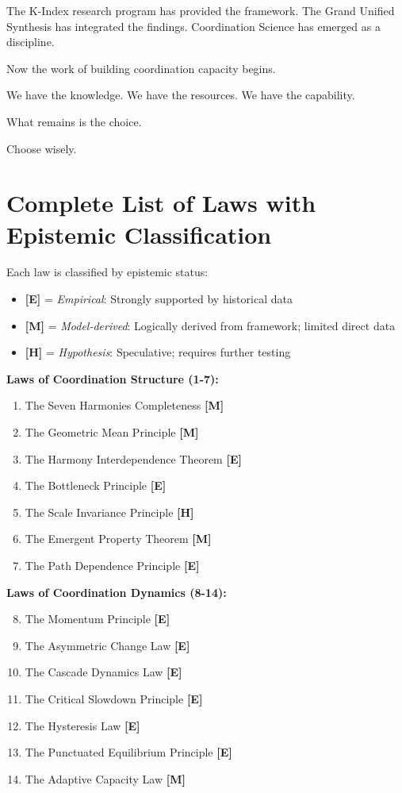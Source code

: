 \documentclass[12pt,letterpaper]{article}
\begin{document}
The K-Index research program has provided the framework. The Grand Unified Synthesis has integrated the findings. Coordination Science has emerged as a discipline.

Now the work of building coordination capacity begins.

We have the knowledge. We have the resources. We have the capability.

What remains is the choice.

Choose wisely.


\appendix

\section{Complete List of Laws with Epistemic Classification}

Each law is classified by epistemic status:
\begin{itemize}
    \item \textbf{[E]} = \textit{Empirical}: Strongly supported by historical data
    \item \textbf{[M]} = \textit{Model-derived}: Logically derived from framework; limited direct data
    \item \textbf{[H]} = \textit{Hypothesis}: Speculative; requires further testing
\end{itemize}

\textbf{Laws of Coordination Structure (1-7):}
\begin{enumerate}
    \item The Seven Harmonies Completeness \textbf{[M]}
    \item The Geometric Mean Principle \textbf{[M]}
    \item The Harmony Interdependence Theorem \textbf{[E]}
    \item The Bottleneck Principle \textbf{[E]}
    \item The Scale Invariance Principle \textbf{[H]}
    \item The Emergent Property Theorem \textbf{[M]}
    \item The Path Dependence Principle \textbf{[E]}
\end{enumerate}

\textbf{Laws of Coordination Dynamics (8-14):}
\begin{enumerate}
\setcounter{enumi}{7}
    \item The Momentum Principle \textbf{[E]}
    \item The Asymmetric Change Law \textbf{[E]}
    \item The Cascade Dynamics Law \textbf{[E]}
    \item The Critical Slowdown Principle \textbf{[E]}
    \item The Hysteresis Law \textbf{[E]}
    \item The Punctuated Equilibrium Principle \textbf{[E]}
    \item The Adaptive Capacity Law \textbf{[M]}
\end{enumerate}
\end{document}
